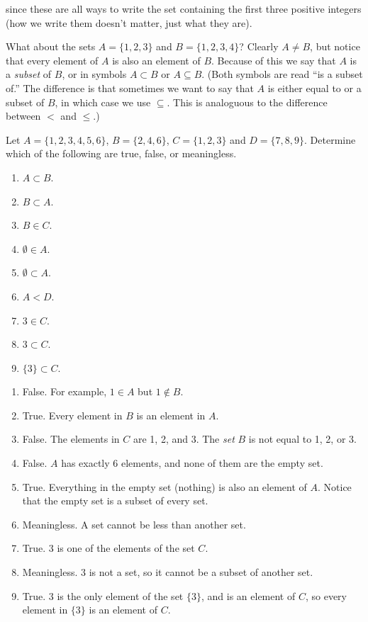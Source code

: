 \documentclass[12pt]{article}
\begin{document}
since these are all ways to write the set containing the first three positive integers (how we write them doesn't matter, just what they are).

What about the sets $A = \{1, 2, 3\}$ and $B = \{1, 2, 3, 4\}$?  Clearly $A \ne B$, but notice that every element of $A$ is also an element of $B$.  Because of this we say that $A$ is a \emph{subset} of $B$, or in symbols $A \subset B$ or $A \subseteq B$.  (Both symbols are read ``is a subset of.'' The difference is that sometimes we want to say that $A$ is either equal to or a subset of $B$, in which case we use $\subseteq$.  This is analoguous to the difference between $<$ and $\le$.)

\begin{example}
 Let $A = \{1, 2, 3, 4, 5, 6\}$, $B = \{2, 4, 6\}$, $C = \{1, 2, 3\}$ and $D = \{7, 8, 9\}$.  Determine which of the following are true, false, or meaningless.
\begin{multicols}{3}
\begin{enumerate}
\item $A \subset B$.
\item $B \subset A$.
\item $B \in C$.
\item $\emptyset \in A$.
\item $\emptyset \subset A$.
\item $A < D$.
\item $3 \in C$.
\item $3 \subset C$.
\item $\{3\} \subset C$.
\end{enumerate}
\end{multicols}
\begin{solution}
 \begin{enumerate}
  \item False. For example, $1\in A$ but $1 \notin B$.
\item True. Every element in $B$ is an element in $A$.
\item False. The elements in $C$ are 1, 2, and 3.  The \emph{set} $B$ is not equal to 1, 2, or 3.
\item False. $A$ has exactly 6 elements, and none of them are the empty set.
\item True. Everything in the empty set (nothing) is also an element of $A$.  Notice that the empty set is a subset of every set.
\item Meaningless.  A set cannot be less than another set.
\item True.  $3$ is one of the elements of the set $C$.
\item Meaningless.  $3$ is not a set, so it cannot be a subset of another set.
\item True.  $3$ is the only element of the set $\{3\}$, and is an element of $C$, so every element in $\{3\}$ is an element of $C$.
 \end{enumerate}
\end{solution}
\end{example}
\end{document}

